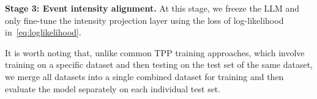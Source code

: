 \textbf{Stage 3: Event intensity alignment.} At this stage, we freeze the LLM and only fine-tune the intensity projection layer using the loss of log-likelihood in~\cref{eq:loglikelihood}. 

It is worth noting that, unlike common TPP training approaches, which involve training on a specific dataset and then testing on the test set of the same dataset, we merge all datasets into a single combined dataset for training and then evaluate the model separately on each individual test set. 



